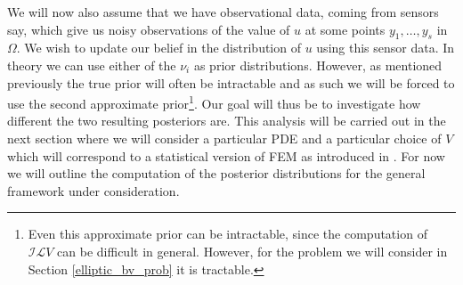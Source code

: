 We will now also assume that we have observational data, coming from sensors say, which give us noisy observations of the value of $u$ at some points $y_{1},\dots,y_{s}$ in $\Omega$. We wish to update our belief in the distribution of $u$ using this sensor data. In theory we can use either of the $\nu_{i}$ as prior distributions. However, as mentioned previously the true prior will often be intractable and as such we will be forced to use the second approximate prior\footnote{Even this approximate prior can be intractable, since the computation of $\mathcal{I}\mathcal{L}V$ can be difficult in general. However, for the problem we will consider in Section \textcolor{blue}{\ref{elliptic_bv_prob}} it is tractable.}. Our goal will thus be to investigate how different the two resulting posteriors are. This analysis will be carried out in the next section where we will consider a particular PDE and a particular choice of $V$ which will correspond to a statistical version of FEM as introduced in \textcolor{blue}{\citep{girolami2019statistical}}. For now we will outline the computation of the posterior distributions for the general framework under consideration.

